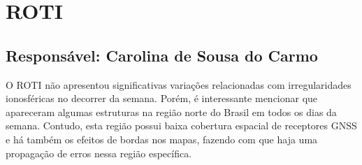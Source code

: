 \documentclass[a4paper, 10pt]{article}
\begin{document}
    \section{ROTI} 
 \subsection{Responsável: Carolina de Sousa do Carmo} 
 
O ROTI não apresentou significativas variações relacionadas com irregularidades ionosféricas no decorrer da semana. Porém, é interessante mencionar que apareceram algumas estruturas na região norte do Brasil em todos os dias da semana. Contudo, esta região possui baixa cobertura espacial de receptores GNSS e há também os efeitos de bordas nos mapas, fazendo com que haja uma propagação de erros nessa região específica.
\end{document}
